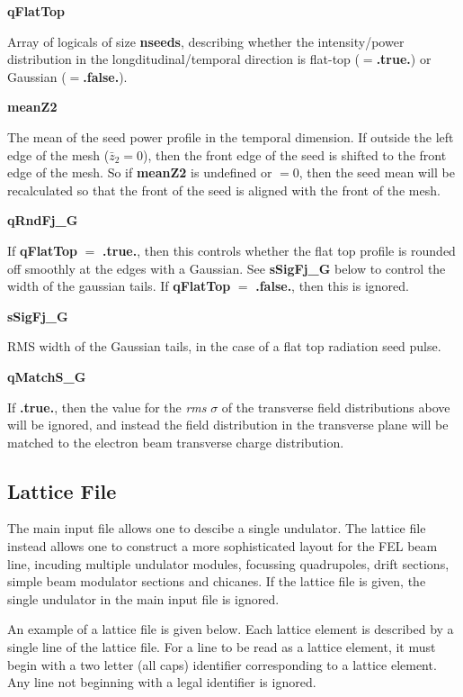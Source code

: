 \documentclass[12pt]{article}%
\begin{document}
{\bf qFlatTop}

Array of logicals of size {\bf nseeds}, describing whether the intensity/power distribution in the longditudinal/temporal direction is flat-top ($=${\bf .true.}) or Gaussian ($=${\bf .false.}).


{\bf meanZ2}

The mean of the seed power profile in the temporal dimension. If outside the left edge of the mesh ($\bar{z}_2 = 0$), then the front edge of the seed is shifted to the front edge of the mesh. So if {\bf meanZ2} is undefined or $=0$, then the seed mean will be recalculated so that the front of the seed is aligned with the front of the mesh.



{\bf qRndFj\_G}

If {\bf qFlatTop} $=$ {\bf .true.}, then this controls whether the flat top profile is rounded off smoothly at the edges with a Gaussian. See {\bf sSigFj\_G} below to control the width of the gaussian tails. If {\bf qFlatTop} $=$ {\bf .false.}, then this is ignored.


{\bf sSigFj\_G}

RMS width of the Gaussian tails, in the case of a flat top radiation seed pulse.

{\bf qMatchS\_G}

If {\bf .true.}, then the value for the \textit{rms} $\sigma$ of the transverse field distributions above will be ignored, and instead the field distribution in the transverse plane will be matched to the electron beam transverse charge distribution.



\newpage

\subsection{Lattice File}

The main input file allows one to descibe a single undulator. The lattice file instead allows one to construct a more sophisticated layout for the FEL beam line, incuding multiple undulator modules, focussing quadrupoles, drift sections, simple beam modulator sections and chicanes. If the lattice file is given, the single undulator in the main input file is ignored.

An example of a lattice file is given below. Each lattice element is described by a single line of the lattice file. For a line to be read as a lattice element, it must begin with a two letter (all caps) identifier corresponding to a lattice element. Any line not beginning with a legal identifier is ignored.
\end{document}
